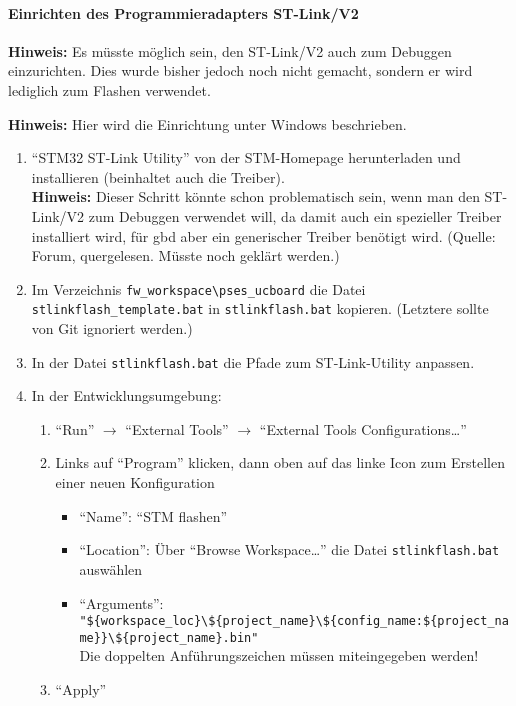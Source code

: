 \paragraph{Einrichten des Programmieradapters ST-Link/V2}

\textbf{Hinweis:} Es müsste möglich sein, den ST-Link/V2 auch zum Debuggen einzurichten. Dies wurde bisher jedoch noch nicht gemacht, sondern er wird lediglich zum Flashen verwendet.

\textbf{Hinweis:} Hier wird die Einrichtung unter Windows beschrieben.

\begin{enumerate}
	\item "`STM32 ST-Link Utility"' von der STM-Homepage herunterladen und installieren (beinhaltet auch die Treiber). \\ \textbf{Hinweis:} Dieser Schritt könnte schon problematisch sein, wenn man den ST-Link/V2 zum Debuggen verwendet will, da damit auch ein spezieller Treiber installiert wird, für gbd aber ein generischer Treiber benötigt wird. (Quelle: Forum, quergelesen. Müsste noch geklärt werden.)
	\item Im Verzeichnis \verb|fw_workspace\pses_ucboard| die Datei \verb|stlinkflash_template.bat| in \verb|stlinkflash.bat| kopieren. (Letztere sollte von Git ignoriert werden.)
	\item In der Datei \verb|stlinkflash.bat| die Pfade zum ST-Link-Utility anpassen.
	\item In der Entwicklungsumgebung: 
		\begin{enumerate}
			\item "`Run"' $\to$ "`External Tools"' $\to$ "`External Tools Configurations\ldots"'
			\item Links auf "`Program"' klicken, dann oben auf das linke Icon zum Erstellen einer neuen Konfiguration
				\begin{itemize}
					\item "`Name"': "`STM flashen"'
					\item "`Location"': Über "`Browse Workspace\ldots"' die Datei \verb|stlinkflash.bat| auswählen
					\item "`Arguments"': \\
						{\small \verb|"${workspace_loc}\${project_name}\${config_name:${project_name}}\${project_name}.bin"|}\\
						Die doppelten Anführungszeichen müssen miteingegeben werden!
				\end{itemize}
			\item "`Apply"'

\end{enumerate}
\end{enumerate}

